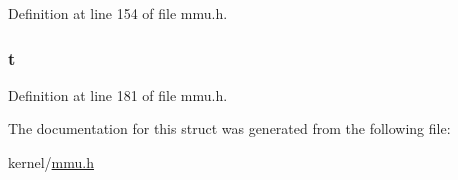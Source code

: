 Definition at line 154 of file mmu.\-h.

\hypertarget{structtaskstate_a9b8e73e27617f93d7f09ec6cf4fe15ea}{
\subsubsection[{t}]{ t}}\label{structtaskstate_a9b8e73e27617f93d7f09ec6cf4fe15ea}


Definition at line 181 of file mmu.\-h.



The documentation for this struct was generated from the following file\-:\begin{DoxyCompactItemize}
\item 
kernel/\hyperlink{mmu_8h}{mmu.\-h}\end{DoxyCompactItemize}

